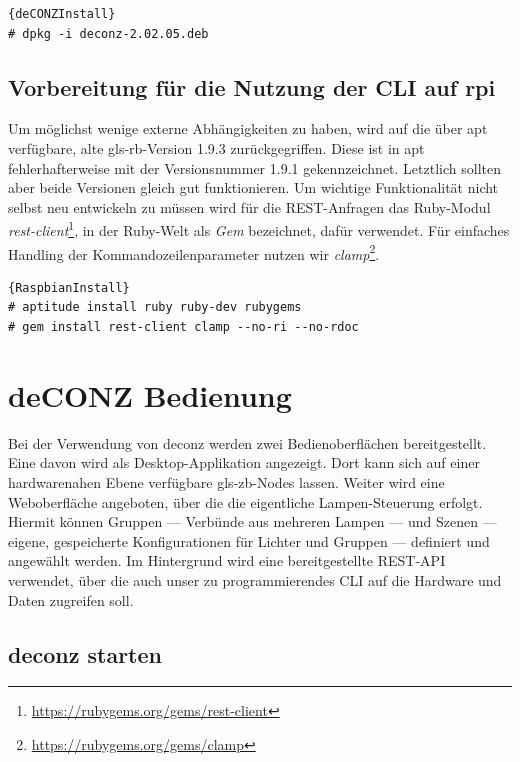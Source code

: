 \documentclass[a4paper,12pt]{article}
\begin{document}
\begin{lstlisting}[caption=deCONZ installieren]{deCONZInstall}
# dpkg -i deconz-2.02.05.deb
\end{lstlisting}

\subsection{Vorbereitung für die Nutzung der CLI auf \gls{rpi}}

Um möglichst wenige externe Abhängigkeiten zu haben, wird auf die über \gls{apt}
verfügbare, alte \gls{gls-rb}-Version 1.9.3 zurückgegriffen. Diese ist in \gls{apt}
fehlerhafterweise mit der Versionsnummer 1.9.1 gekennzeichnet. Letztlich sollten
aber beide Versionen gleich gut funktionieren.
Um wichtige Funktionalität nicht selbst neu entwickeln zu müssen wird für die
REST-Anfragen das Ruby-Modul
\emph{rest-client}\footnote{\url{https://rubygems.org/gems/rest-client}}, in der
Ruby-Welt als \emph{Gem} bezeichnet, dafür verwendet. Für einfaches Handling der
Kommandozeilenparameter nutzen wir
\emph{clamp}\footnote{\url{https://rubygems.org/gems/clamp}}.

\begin{lstlisting}[caption=Ruby und Ruby-Modulmanager installieren]{RaspbianInstall}
# aptitude install ruby ruby-dev rubygems
# gem install rest-client clamp --no-ri --no-rdoc
\end{lstlisting}

\section{deCONZ Bedienung}
\label{deconz}

Bei der Verwendung von \acrshort{deconz} werden zwei Bedienoberflächen bereitgestellt.
Eine davon wird als Desktop-Applikation angezeigt. Dort kann sich auf einer hardwarenahen
Ebene verfügbare \gls{gls-zb}-Nodes lassen.
Weiter wird eine Weboberfläche angeboten, über die die eigentliche Lampen-Steuerung
erfolgt. Hiermit können Gruppen --- Verbünde aus mehreren Lampen --- und Szenen
--- eigene, gespeicherte Konfigurationen für Lichter und Gruppen --- definiert und
angewählt werden. Im Hintergrund wird eine bereitgestellte REST-API verwendet, über die
auch unser zu programmierendes CLI auf die Hardware und Daten zugreifen soll.

\subsection{\acrshort{deconz} starten}
\end{document}
